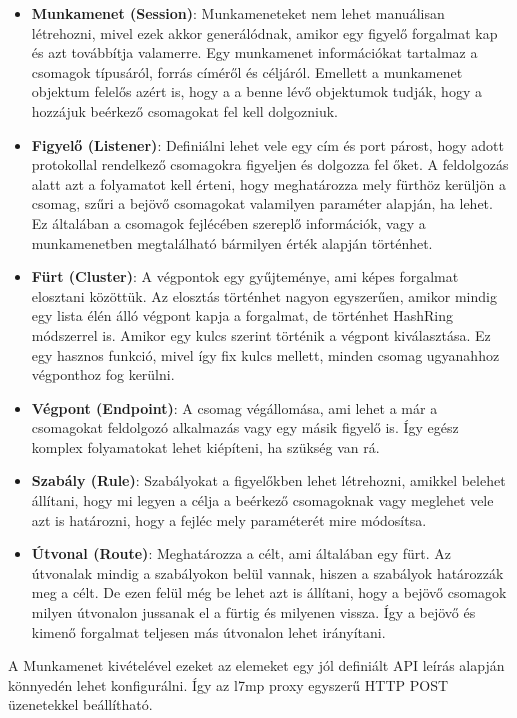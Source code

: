 \begin{itemize}
	\item \textbf{Munkamenet (Session)}: Munkameneteket nem lehet manuálisan létrehozni,
	mivel ezek akkor generálódnak, amikor egy figyelő forgalmat kap és azt 
	továbbítja valamerre. Egy munkamenet információkat tartalmaz a csomagok típusáról,
	forrás címéről és céljáról. Emellett a munkamenet objektum felelős azért is, hogy a
	a benne lévő objektumok tudják, hogy a hozzájuk beérkező csomagokat fel kell dolgozniuk. 
	\item \textbf{Figyelő (Listener)}: Definiálni lehet vele egy cím és port párost, hogy
	adott protokollal rendelkező csomagokra figyeljen és dolgozza fel őket. A feldolgozás
	alatt azt a folyamatot kell érteni, hogy meghatározza mely fürthöz kerüljön a csomag,
	szűri a bejövő csomagokat valamilyen paraméter alapján, ha lehet. Ez általában 
	a csomagok fejlécében szereplő információk, vagy a munkamenetben megtalálható bármilyen
	érték alapján történhet. 
	\item \textbf{Fürt (Cluster)}: A végpontok egy gyűjteménye, ami képes forgalmat elosztani
	közöttük. Az elosztás történhet nagyon egyszerűen, amikor mindig egy lista élén álló
	végpont kapja a forgalmat, de történhet HashRing módszerrel is. Amikor egy kulcs szerint
	történik a végpont kiválasztása. Ez egy hasznos funkció, mivel így fix kulcs mellett,
	minden csomag ugyanahhoz végponthoz fog kerülni. 
	\item \textbf{Végpont (Endpoint)}: A csomag végállomása, ami lehet a már a csomagokat
	feldolgozó alkalmazás vagy egy másik figyelő is. Így egész komplex folyamatokat 
	lehet kiépíteni, ha szükség van rá. 
	\item \textbf{Szabály (Rule)}: Szabályokat a figyelőkben lehet létrehozni, amikkel
	belehet állítani, hogy mi legyen a célja a beérkező csomagoknak vagy meglehet vele azt
	is határozni, hogy a fejléc mely paraméterét mire módosítsa. 
	\item \textbf{Útvonal (Route)}: Meghatározza a célt, ami általában egy fürt. Az 
	útvonalak mindig a szabályokon belül vannak, hiszen a szabályok határozzák meg a célt.
	De ezen felül még be lehet azt is állítani, hogy a bejövő csomagok milyen útvonalon 
	jussanak el a fürtig és milyenen vissza. Így a bejövő és kimenő forgalmat teljesen 
	más útvonalon lehet irányítani.
\end{itemize}

A Munkamenet kivételével ezeket az elemeket egy jól definiált API leírás alapján 
könnyedén lehet konfigurálni. Így az l7mp proxy egyszerű HTTP POST üzenetekkel 
beállítható.

